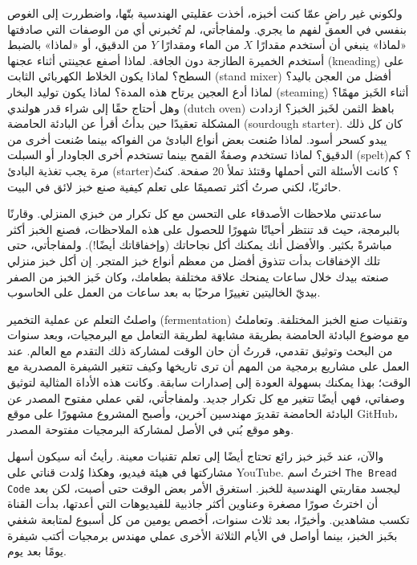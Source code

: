 ولكوني غير راضٍ عمّا كنت أخبزه، أخذت عقليتي الهندسية بتّها، واضطررت إلى
الغوص بنفسي في العمق لفهم ما يجري. ولمفاجأتي، لم تُخبرني أي من الوصفات
التي صادفتها «لماذا» ينبغي أن أستخدم مقدارًا $X$ من الماء ومقدارًا $Y$
من الدقيق، أو «لماذا» بالضبط أستخدم الخميرة الطازجة دون الجافة. لماذا
أصفع عجينتي أثناء عجنها \textenglish{(kneading)} على السطح؟ لماذا يكون
الخلاط الكهربائي الثابت \textenglish{(stand mixer)} أفضل من العجن
باليد؟ لماذا أدع العجين يرتاح هذه المدة؟ لماذا يكون توليد البخار
\textenglish{(steaming)} أثناء الخَبز مهمًا؟ وهل أحتاج حقًا إلى شراء قدر
هولندي \textenglish{(dutch oven)} باهظ الثمن لخَبز الخبز؟ ازدادت
المشكلة تعقيدًا حين بدأتُ أقرأ عن البادئة الحامضة
\textenglish{(sourdough starter)}. كان كل ذلك يبدو كسحر أسود. لماذا
صُنعت بعض أنواع البادئ من الفواكه بينما صُنعت أخرى من الدقيق؟ لماذا
تستخدم وصفةٌ القمح بينما تستخدم أخرى الجاودار أو السبلت
\textenglish{(spelt)}؟ كم مرة يجب تغذية البادئ \textenglish{(starter)}؟
كانت الأسئلة التي أحملها وقتئذ تملأ 20 صفحة. كنتُ حائريًا، لكني صرتُ
أكثر تصميمًا على تعلم كيفية صنع خبز لائق في البيت.

ساعدتني ملاحظات الأصدقاء على التحسن مع كل تكرار من خبزي المنزلي. وقارنًا
بالبرمجة، حيث قد تنتظر أحيانًا شهورًا للحصول على هذه الملاحظات، فصنع
الخبز أكثر مباشرةً بكثير. والأفضل أنك يمكنك أكل نجاحاتك (وإخفاقاتك
أيضًا!). ولمفاجأتي، حتى تلك الإخفاقات بدأت تتذوق أفضل من معظم أنواع خبز
المتجر. إن أكل خبز منزلي صنعته بيدك خلال ساعات يمنحك علاقة مختلفة
بطعامك، وكان خَبز الخبز من الصفر بيديّ الخاليتين تغييرًا مرحبًا به بعد
ساعات من العمل على الحاسوب.

واصلتُ التعلم عن عملية التخمير \textenglish{(fermentation)} وتقنيات صنع
الخبز المختلفة. وتعاملتُ مع موضوع البادئة الحامضة بطريقة مشابهة لطريقة
التعامل مع البرمجيات، وبعد سنوات من البحث وتوثيق تقدمي، قررتُ أن حان
الوقت لمشاركة ذلك التقدم مع العالم. عند العمل على مشاريع برمجية من
المهم أن ترى تاريخها وكيف تتغير الشيفرة المصدرية مع الوقت؛ بهذا يمكنك
بسهولة العودة إلى إصدارات سابقة. وكانت هذه الأداة المثالية لتوثيق
وصفاتي، فهي أيضًا تتغير مع كل تكرار جديد. ولمفاجأتي، لقي عملي مفتوح
المصدر عن البادئة الحامضة تقديرَ مهندسين آخرين، وأصبح المشروع مشهورًا
على موقع \textenglish{GitHub}، وهو موقع بُني في الأصل لمشاركة البرمجيات
مفتوحة المصدر.

والآن، عند خَبز خبز رائع تحتاج أيضًا إلى تعلم تقنيات معينة. رأيتُ أنه
سيكون أسهل مشاركتها في هيئة فيديو، وهكذا وُلدت قناتي على
\textenglish{YouTube}. اخترتُ اسم \textenglish{\texttt{The Bread Code}}
ليجسد مقاربتي الهندسية للخبز. استغرق الأمر بعض الوقت حتى أصبت، لكن بعد
أن اخترتُ صورًا مصغرة وعناوين أكثر جاذبية للفيديوهات التي أعدتها، بدأت
القناة تكسب مشاهدين. وأخيرًا، بعد ثلاث سنوات، أخصص يومين من كل أسبوع
لمتابعة شغفي بخَبز الخبز، بينما أواصل في الأيام الثلاثة الأخرى عملي
مهندس برمجيات أكتب شيفرة يومًا بعد يوم.

